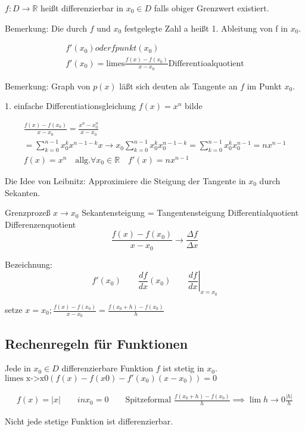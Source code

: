 \begin{definition}[1. Ableitung]
	\( f:D\rightarrow \mathbb{R} \) heißt differenzierbar in \( x_0 \in D \) falls obiger Grenzwert existiert.
\end{definition}
Bemerkung: Die durch \( f \) und \( x_0 \) festgelegte Zahl a heißt 1. Ableitung von f in \( x_0 \).

\begin{align*}
	f'(x_0) oder fpunkt(x_0) \\
	f'(x_0) = \text{limes} \frac{f(x)-f(x_0)}{x-x_0} \text{Differentioalquotient}
\end{align*}


Bemerkung: Graph von \( p(x) \) läßt sich deuten als Tangente an \( f \) im Punkt \( x_0 \).

1. einfache Differentiationsgleichung \( f(x)=x^n \) bilde

\begin{align*}
	\frac{f(x)-f(x_0)}{x-x_0}=\frac{x^n-x_0^n}{x-x_0} \\
	= \sum_{k=0}^{n-1}x_0^kx^{n-1-k} x \rightarrow x_0 \sum_{k=0}^{n-1}x_0^kx_0^{n-1-k} = \sum_{k=0}^{n-1}x_0^kx_0^{n-1} = nx^{n-1} \\
	f(x)=x^n \quad \text{allg.} \forall x_0 \in \mathbb{R} \quad f'(x)=nx^{n-1} 
\end{align*}

Die Idee von Leibnitz: Approximiere die Steigung der Tangente in \( x_0 \) durch Sekanten.


Grenzprozeß \( x \rightarrow x_0 \) Sekantensteigung = Tangentensteigung
Differentialquotient Differenzenquotient
\[
	\frac{f(x)-f(x_0)}{x-x_0} \rightarrow \frac{\Delta f}{\Delta x}
\]

Bezeichnung:
\[
	f'(x_0) \qquad \frac{df}{dx}(x_0) \qquad \left.\frac{df}{dx}\right|_{x=x_0}
\]

setze \( x = x_0; \frac{f(x)-f(x_0)}{x-x_0} = \frac{f(x_0+h)-f(x_0)}{h}\)

\subsection{Rechenregeln für Funktionen}
\label{sec:rechenregeln_f_funktionen}

\begin{theorem}[1. Aussage]
	Jede in \( x_0 \in D \) differenzierbare Funktion \( f \) ist stetig in \( x_0\).
	\( \text{limes x->x0} (f(x)-f(x0)-f'(x_0)(x-x_0)) = 0 \)
\end{theorem}
\begin{align*}
	f(x)=|x| \qquad in x_0=0 \qquad \text{Spitze}
	\text{formal } \frac{f(x_0+h)-f(x_0)}{h} \implies \lim{h \rightarrow 0}\frac{|h|}{h} 
\end{align*}
\begin{theorem}[2. Aussage]
	Nicht jede stetige Funktion ist differenzierbar.

\end{theorem}

